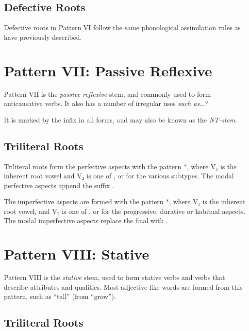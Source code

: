 \documentclass[grammar]{subfiles}
\begin{document}
\subsection{Defective Roots}
\label{ssec:vm_vi_defective_roots}

Defective roots in Pattern VI follow the same phonological assimilation rules
as have previously described. 


\section{Pattern VII: Passive Reflexive}
\label{sec:vm_pattern_vii}

Pattern VII is the \emph{passive reflexive} stem, and commonly used to form
anticausative verbs.  It also has a number of irregular uses \tbw\emph{such as…?}
%

It is marked by the infix  in all forms, and may also be known as the \emph{NT-stem}.


\subsection{Triliteral Roots}
\label{ssec:vm_vii_triliteral_roots}

Triliteral roots form the perfective aspects with the pattern
*, where V₁ is the inherent root vowel and V₂ is one of
,  or  for the various subtypes.  The modal perfective
aspects append the suffix .

The imperfective aspects are formed with the pattern *,
where V₁ is the inherent root vowel, and V₂ is one of ,  or
 for the progressive, durative or habitual aspects.  The modal
imperfective aspects replace the final  with .


\section{Pattern VIII: Stative} \label{sec:vm_pattern_viii}

Pattern VIII is the \emph{stative} stem, used to form stative verbs and verbs
that describe attributes and qualities.  Most adjective-like words are formed
from this pattern, such as  “tall” (from  “grow”).


\subsection{Triliteral Roots}
\label{ssec:vm_viii_triliteral_roots}
\end{document}

